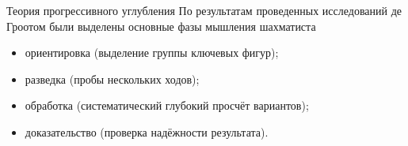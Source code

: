 \begin{frame}{Теория прогрессивного углубления}
По результатам проведенных исследований де Гроотом были выделены основные фазы мышления шахматиста\footnotemark{}
\begin{itemize}
\item ориентировка (выделение группы ключевых фигур);
\item разведка (пробы нескольких ходов);
\item обработка (систематический глубокий просчёт вариантов);
\item доказательство (проверка надёжности результата).
\end{itemize}
\end{frame}